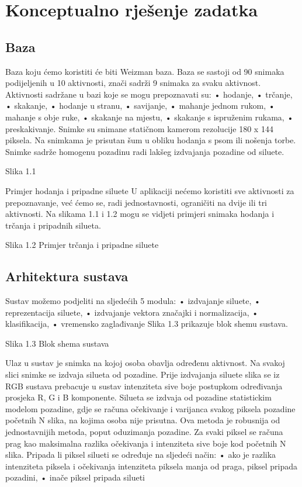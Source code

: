 \documentclass[times, utf8, diplomski]{fer}
\begin{document}
\section{Konceptualno rješenje zadatka}

\subsection{Baza}

Baza koju ćemo koristiti će biti Weizman baza. Baza se sastoji od 90 snimaka podijeljenih u
10 aktivnosti, znači sadrži 9 snimaka za svaku aktivnost. Aktivnosti sadržane u bazi koje se
mogu prepoznavati su:
• hodanje,
• trčanje,
• skakanje,
• hodanje u stranu,
• savijanje,
• mahanje jednom rukom,
• mahanje s obje ruke,
• skakanje na mjestu,
• skakanje s ispruženim rukama,
• preskakivanje.
Snimke su snimane statičnom kamerom rezolucije 180 x 144 piksela. Na snimkama je
prisutan šum u obliku hodanja s psom ili nošenja torbe. Snimke sadrže homogenu pozadinu
radi lakšeg izdvajanja pozadine od siluete.


Slika 1.1 

Primjer hodanja i pripadne siluete
U aplikaciji nećemo koristiti sve aktivnosti za prepoznavanje, već ćemo se, radi
jednostavnosti, ograničiti na dvije ili tri aktivnosti. Na slikama 1.1 i 1.2 mogu se vidjeti
primjeri snimaka hodanja i trčanja i pripadnih silueta.

Slika 1.2 Primjer trčanja i pripadne siluete

\subsection{Arhitektura sustava}

Sustav možemo podjeliti na sljedećih 5 modula:
• izdvajanje siluete,
• reprezentacija siluete,
• izdvajanje vektora značajki i normalizacija,
• klasifikacija,
• vremensko zaglađivanje
Slika 1.3 prikazuje blok shemu sustava.

Slika 1.3 Blok shema sustava

Ulaz u sustav je snimka na kojoj osoba obavlja određenu aktivnost. Na svakoj slici snimke se
izdvaja silueta od pozadine. Prije izdvajanja siluete slika se iz RGB sustava prebacuje u sustav
intenziteta sive boje postupkom određivanja prosjeka R, G i B komponente. Silueta se izdvaja
od pozadine statistickim modelom pozadine, gdje se računa očekivanje i varijanca svakog
piksela pozadine početnih N slika, na kojima osoba nije prisutna. Ova metoda je robusnija od
jednostavnijih metoda, poput oduzimanja pozadine. Za svaki piksel se računa prag kao
maksimalna razlika očekivanja i intenziteta sive boje kod početnih N slika. Pripada li piksel
silueti se određuje na sljedeći način:
• ako je razlika intenziteta piksela i očekivanja intenziteta piksela manja od praga, piksel
pripada pozadini,
• inače piksel pripada silueti
\end{document}
